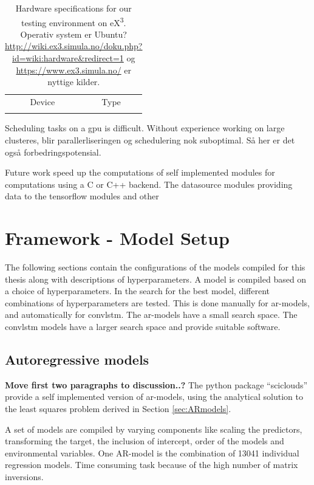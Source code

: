 \begin{table}[ht]
    \centering
    \begin{tabular}{c|c}
        Device &  Type  \\
         & 
    \end{tabular}
    \caption{Hardware specifications for our testing environment on eX\textsuperscript{3}. Operativ system er Ubuntu? \href{http://wiki.ex3.simula.no/doku.php?id=wiki:hardware&redirect=1}{http://wiki.ex3.simula.no/doku.php?id=wiki:hardware&redirect=1} og \href{https://www.ex3.simula.no/}{https://www.ex3.simula.no/} er nyttige kilder.
    }
    \label{tab:hardware_ex3}
\end{table}

Scheduling tasks on a gpu is difficult. Without experience working on large clusteres, blir parallerliseringen og schedulering nok suboptimal. Så her er det også forbedringspotensial.

Future work speed up the computations of self implemented modules for computations using  a C or C++ backend. The datasource modules providing data to the tensorflow modules and other 

\section{Framework - Model Setup}
The following sections contain the configurations of the models compiled for this thesis along with descriptions of hyperparameters. A model is compiled based on a choice of hyperparameters. In the search for the best model, different combinations of hyperparameters are tested. This is done manually for \acrshort{ar}-models, and automatically for \acrshort{convlstm}. The \acrshort{ar}-models have a small search space. The \acrshort{convlstm} models have a larger search space and  provide suitable software. 


\subsection{Autoregressive models}
\textbf{Move first two paragraphs to discussion..?}
The python package ``sciclouds'' provide a self implemented version of \acrshort{ar}-models, using the analytical solution to the least squares problem derived in Section \ref{sec:ARmodels}. 

A set of models are compiled by varying components like scaling the predictors, transforming the target, the inclusion of intercept, order of the models and environmental variables. One AR-model is the combination of 13041 individual regression models. Time consuming task because of the high number of matrix inversions. 

